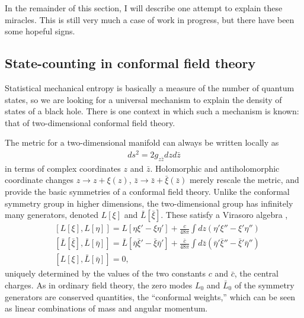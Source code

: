 \documentclass[12pt]{article}
\begin{document}
In the remainder of this section, I will describe one attempt to
explain these miracles.  This is still very much a case of work in
progress, but there have been some hopeful signs.

\subsection{State-counting in conformal field theory}

Statistical mechanical entropy is basically a measure of the number
of quantum states, so we are looking for a universal mechanism to
explain the density of states of a black hole.  There is one context
in which such a mechanism is known: that of two-dimensional
conformal field theory.

The metric for a two-dimensional manifold can always be written 
locally as
\begin{align}
ds^2 = 2g_{z{\bar z}}dzd{\bar z}
\label{Carlipi1}
\end{align}
in terms of complex coordinates $z$ and $\bar z$.  Holomorphic 
and antiholomorphic coordinate changes $z\rightarrow z + \xi(z)$,
${\bar z}\rightarrow {\bar z} + {\bar\xi}({\bar z})$ merely rescale the 
metric, and  provide the basic symmetries of a conformal field theory.   
Unlike the conformal symmetry group in higher dimensions, the
two-dimensional group has infinitely many generators, denoted 
$L[\xi]$ and ${\bar L}[{\bar\xi}]$.  These satisfy a Virasoro algebra 
\cite{FMS},
\begin{align}
&[L[\xi],L[\eta]] 
   = L[\eta\xi' - \xi\eta']   + \frac{c}{48\pi}\int dz\left( \eta'\xi'' - \xi'\eta''\right) \nonumber\\
&[{\bar L}[{\bar\xi}],{\bar L}[{\bar\eta}]] 
   = {\bar L}[{\bar\eta}{\bar\xi}' - {\bar\xi}{\bar\eta}']  + \frac{{\bar c}}{48\pi}%
   \int d{\bar z}\left( {\bar\eta}'{\bar\xi}'' - {\bar\xi}'{\bar\eta}''\right) \nonumber\\
&[ L[\xi],{\bar L}[{\bar\eta}]] = 0 , 
\label{Carlipi2}
\end{align}
uniquely determined by the values of the two constants $c$ and $\bar c$, the 
central charges.  As in ordinary field theory, the zero modes $L_0$ and ${\bar L}_0$ 
of the symmetry generators are conserved quantities, the ``conformal weights,''
which can be seen as linear combinations of mass and angular momentum.
\end{document}
